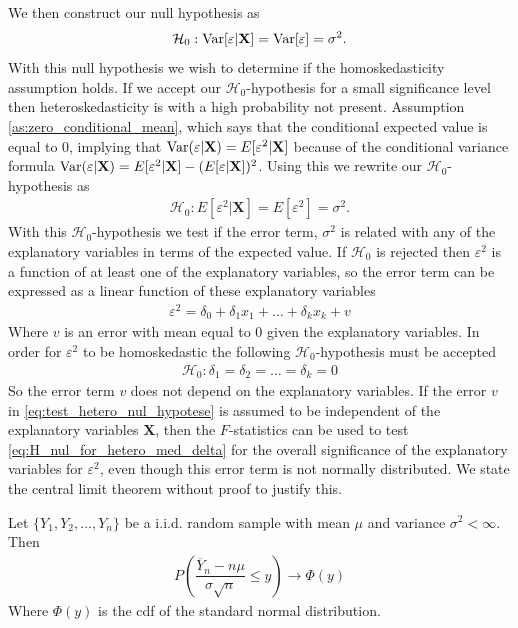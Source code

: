 We then construct our null hypothesis as
\begin{align*}
    \mathcal{H}_0 : \operatorname{\text{Var}}[\varepsilon | \mathbf{X}] = \operatorname{\text{Var}}[\varepsilon] = \sigma^2. 
\end{align*}
With this null hypothesis we wish to determine if the homoskedasticity assumption holds. 
If we accept our $\mathcal{H}_0$-hypothesis for a small significance level then heteroskedasticity is with a high probability not present.
Assumption \ref{as:zero_conditional_mean}, which says that the conditional expected value is equal to $0$, implying that $\operatorname{\text{Var}}(\varepsilon | \mathbf{X}) = E[\varepsilon^2 | \mathbf{X}]$ because of the conditional variance formula $\operatorname{\text{Var}}(\varepsilon | \mathbf{X}) = E[\varepsilon^2 | \mathbf{X}] - (E[\varepsilon | \mathbf{X}])^2$. Using this we rewrite our $\mathcal{H}_0$-hypothesis as
\begin{align*}
    \mathcal{H}_0 : E[\varepsilon^2 | \mathbf{X}] = E[\varepsilon^2] = \sigma^2.
\end{align*}
With this $\mathcal{H}_0$-hypothesis we test if the error term, $\sigma^2$ is related with any of the explanatory variables in terms of the expected value.  
If $\mathcal{H}_0$ is rejected then $\varepsilon^2$ is a function of at least one of the explanatory variables, so the error term can be expressed as a linear function of these explanatory variables
\begin{align}\label{eq:test_hetero_nul_hypotese}
    \varepsilon^2 = \delta_0 + \delta_1x_1 + \ldots + \delta_kx_k + v
\end{align}
Where $v$ is an error with mean equal to $0$ given the explanatory variables. In order for $\varepsilon^2$ to be homoskedastic the following $\mathcal{H}_0$-hypothesis must be accepted 
\begin{align}\label{eq:H_nul_for_hetero_med_delta}
    \mathcal{H}_0 : \delta_1 = \delta_2 = \ldots = \delta_k = 0
\end{align}
So the error term $v$ does not depend on the explanatory variables. 
If the error $v$ in \eqref{eq:test_hetero_nul_hypotese} is assumed to be independent of the explanatory variables $\mathbf{X}$, then the $F$-statistics can be used to test \eqref{eq:H_nul_for_hetero_med_delta} for the overall significance of the explanatory variables for $\varepsilon^2$, even though this error term is not normally distributed.
We state the central limit theorem without proof to justify this. 
\begin{theorem} \label{th:Central_limit_theorem}
Let $\{ Y_1, Y_2, \ldots, Y_n \}$ be a i.i.d.$\!$ random sample with mean $\mu$ and variance $\sigma^2 < \infty$. Then
\begin{align*}
    P\left(\dfrac{\overline{Y}_n - n\mu}{\sigma \sqrt{n}}\leq y\right) \rightarrow \Phi(y)
\end{align*}
Where $\Phi(y)$ is the cdf of the standard normal distribution. 
\end{theorem}
